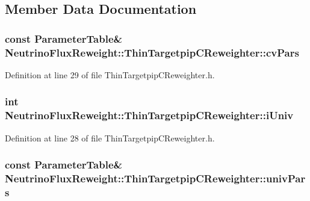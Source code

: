 \subsection{Member Data Documentation}
\hypertarget{class_neutrino_flux_reweight_1_1_thin_targetpip_c_reweighter_af5d2120c06647661015daae96c40f130}{
\subsubsection[{cv\-Pars}]{\setlength{\rightskip}{0pt plus 5cm}const {\bf Parameter\-Table}\& Neutrino\-Flux\-Reweight\-::\-Thin\-Targetpip\-C\-Reweighter\-::cv\-Pars\hspace{0.3cm}{\ttfamily [private]}}}\label{class_neutrino_flux_reweight_1_1_thin_targetpip_c_reweighter_af5d2120c06647661015daae96c40f130}


Definition at line 29 of file Thin\-Targetpip\-C\-Reweighter.\-h.

\hypertarget{class_neutrino_flux_reweight_1_1_thin_targetpip_c_reweighter_a97d91aff2a76990d435c1534a7d29dca}{
\subsubsection[{i\-Univ}]{\setlength{\rightskip}{0pt plus 5cm}int Neutrino\-Flux\-Reweight\-::\-Thin\-Targetpip\-C\-Reweighter\-::i\-Univ\hspace{0.3cm}{\ttfamily [private]}}}\label{class_neutrino_flux_reweight_1_1_thin_targetpip_c_reweighter_a97d91aff2a76990d435c1534a7d29dca}


Definition at line 28 of file Thin\-Targetpip\-C\-Reweighter.\-h.

\hypertarget{class_neutrino_flux_reweight_1_1_thin_targetpip_c_reweighter_a5fb560293bea225254092a20c2261008}{
\subsubsection[{univ\-Pars}]{\setlength{\rightskip}{0pt plus 5cm}const {\bf Parameter\-Table}\& Neutrino\-Flux\-Reweight\-::\-Thin\-Targetpip\-C\-Reweighter\-::univ\-Pars\hspace{0.3cm}{\ttfamily [private]}}}\label{class_neutrino_flux_reweight_1_1_thin_targetpip_c_reweighter_a5fb560293bea225254092a20c2261008}


